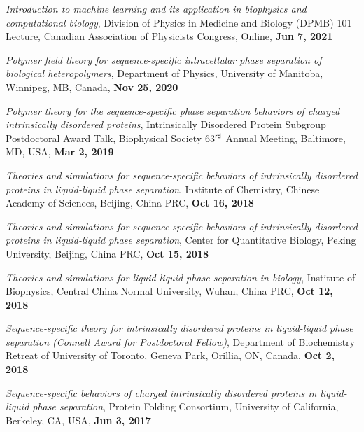 \documentclass[11pt]{../yhlcv}
\begin{document}
\begin{etaremune}[leftmargin=0.26in]

\item {\it Introduction to machine learning and its application in biophysics and computational biology}, Division of Physics in Medicine and Biology (DPMB) 101 Lecture, Canadian Association of Physicists Congress, Online, {\bf Jun 7, 2021}

\item {\it Polymer field theory for sequence-specific intracellular phase separation of biological heteropolymers}, Department of Physics, University of Manitoba, Winnipeg, MB, Canada, {\bf Nov 25, 2020}

\item {\it Polymer theory for the sequence-specific phase separation behaviors of charged intrinsically disordered proteins}, Intrinsically Disordered Protein Subgroup Postdoctoral Award Talk, Biophysical Society 63$^{\sf rd}$  Annual Meeting, Baltimore, MD, USA, {\bf Mar 2, 2019}

\item {\it Theories and simulations for sequence-specific behaviors of intrinsically disordered proteins in liquid-liquid phase separation}, Institute of Chemistry, Chinese Academy of Sciences, Beijing, China PRC, {\bf Oct 16, 2018}

\item {\it Theories and simulations for sequence-specific behaviors of intrinsically disordered proteins in liquid-liquid phase separation}, Center for Quantitative Biology, Peking University, Beijing, China PRC, {\bf Oct 15, 2018}

\item {\it Theories and simulations for liquid-liquid phase separation in biology}, Institute of Biophysics, Central China Normal University, Wuhan, China PRC, {\bf Oct 12, 2018}

\item {\it Sequence-specific theory for intrinsically disordered proteins in liquid-liquid phase separation (Connell Award for Postdoctoral Fellow)}, Department of Biochemistry Retreat of University of Toronto, Geneva Park, Orillia, ON, Canada, {\bf Oct 2, 2018}

\item {\it Sequence-specific behaviors of charged intrinsically disordered proteins
	in liquid-liquid phase separation}, Protein Folding Consortium, University of California, Berkeley, CA, USA, {\bf Jun 3, 2017}


\end{etaremune}
\end{document}
